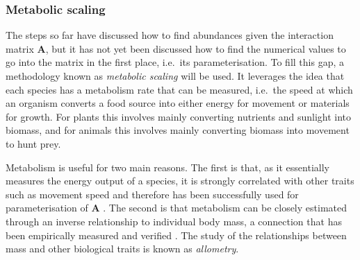 


\subsubsection{Metabolic scaling}
The steps so far have discussed how to find abundances given the interaction matrix $\mathbf{A}$, but it has not yet been discussed how to find the numerical values to go into the matrix in the first place, i.e.\ its parameterisation.
To fill this gap, a methodology known as \emph{metabolic scaling} will be used. It leverages the idea that each species has a metabolism rate that can be measured, i.e.\ the speed at which an organism converts a food source into either energy for movement or materials for growth. For plants this involves mainly converting nutrients and sunlight into biomass, and for animals this involves mainly converting biomass into movement to hunt prey.

Metabolism is useful for two main reasons. The first is that, as it essentially measures the energy output of a species, it is strongly correlated with other traits such as movement speed \cite{Hirt2017} and therefore has been successfully used for parameterisation of $\mathbf{A}$ \cite{Savage2004, Vucic-Pestic2010, Pawar2015}. The second is that metabolism can be closely estimated through an inverse relationship to individual body mass, a connection that has been empirically measured and verified \cite{Brown2004}. The study of the relationships between mass and other biological traits is known as \emph{allometry}.

